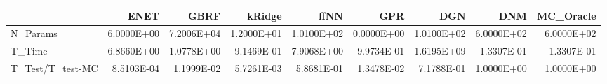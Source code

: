 \begin{tabular}{lrrrrrrrr}
\toprule
{} &       ENET &       GBRF &     kRidge &       ffNN &        GPR &        DGN &        DNM &  MC\_Oracle \\
\midrule
N\_Params         & 6.0000E+00 & 7.2006E+04 & 1.2000E+01 & 1.0100E+02 & 0.0000E+00 & 1.0100E+02 & 6.0000E+02 & 6.0000E+02 \\
T\_Time           & 6.8660E+00 & 1.0778E+00 & 9.1469E-01 & 7.9068E+00 & 9.9734E-01 & 1.6195E+09 & 1.3307E-01 & 1.3307E-01 \\
T\_Test/T\_test-MC & 8.5103E-04 & 1.1999E-02 & 5.7261E-03 & 5.8681E-01 & 1.3478E-02 & 7.1788E-01 & 1.0000E+00 & 1.0000E+00 \\
\bottomrule
\end{tabular}
